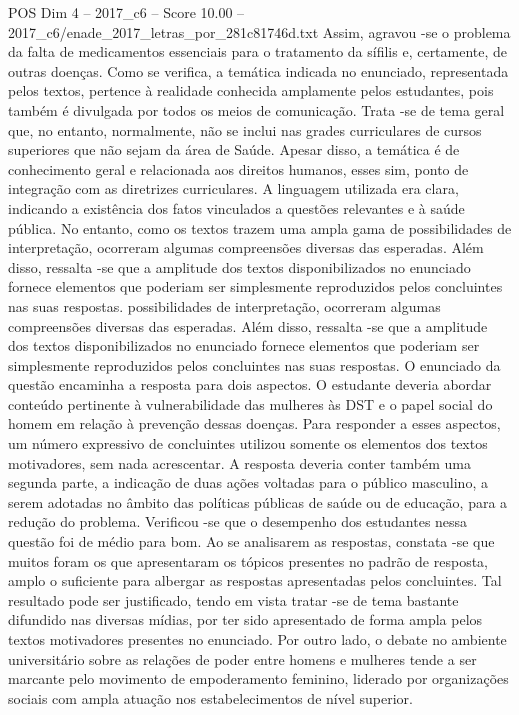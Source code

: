 \begin{textsample}{POS Dim 4 – 2017\_c6 – Score 10.00 – 2017\_c6/enade\_2017\_letras\_por\_281c81746d.txt}
Assim, agravou -se o problema da falta de medicamentos essenciais para o tratamento da sífilis e, certamente, de outras doenças.
Como se verifica, a temática indicada no enunciado, representada pelos textos, pertence à realidade conhecida amplamente pelos estudantes, pois também é divulgada por todos os meios de comunicação.
Trata -se de tema geral que, no entanto, normalmente, não se inclui nas grades curriculares de cursos superiores que não sejam da área de Saúde.
Apesar disso, a temática é de conhecimento geral e relacionada aos direitos humanos, esses sim, ponto de integração com as diretrizes curriculares.
A linguagem utilizada era clara, indicando a existência dos fatos vinculados a questões relevantes e à saúde pública.
No entanto, como os textos trazem uma ampla gama de possibilidades de interpretação, ocorreram algumas compreensões diversas das esperadas.
Além disso, ressalta -se que a amplitude dos textos disponibilizados no enunciado fornece elementos que poderiam ser simplesmente reproduzidos pelos concluintes nas suas respostas. possibilidades de interpretação, ocorreram algumas compreensões diversas das esperadas.
Além disso, ressalta -se que a amplitude dos textos disponibilizados no enunciado fornece elementos que poderiam ser simplesmente reproduzidos pelos concluintes nas suas respostas.
O enunciado da questão encaminha a resposta para dois aspectos.
O estudante deveria abordar conteúdo pertinente à vulnerabilidade das mulheres às DST e o papel social do homem em relação à prevenção dessas doenças.
Para responder a esses aspectos, um número expressivo de concluintes utilizou somente os elementos dos textos motivadores, sem nada acrescentar.
A resposta deveria conter também uma segunda parte, a indicação de duas ações voltadas para o público masculino, a serem adotadas no âmbito das políticas públicas de saúde ou de educação, para a redução do problema.
Verificou -se que o desempenho dos estudantes nessa questão foi de médio para bom.
Ao se analisarem as respostas, constata -se que muitos foram os que apresentaram os tópicos presentes no padrão de resposta, amplo o suficiente para albergar as respostas apresentadas pelos concluintes.
Tal resultado pode ser justificado, tendo em vista tratar -se de tema bastante difundido nas diversas mídias, por ter sido apresentado de forma ampla pelos textos motivadores presentes no enunciado.
Por outro lado, o debate no ambiente universitário sobre as relações de poder entre homens e mulheres tende a ser marcante pelo movimento de empoderamento feminino, liderado por organizações sociais com ampla atuação nos estabelecimentos de nível superior.

\end{textsample}
